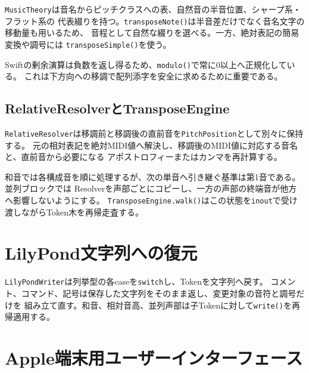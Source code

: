 \documentclass[uplatex,a4paper,11pt]{jsbook}
\begin{document}
\texttt{MusicTheory}は音名からピッチクラスへの表、自然音の半音位置、シャープ系・フラット系の
代表綴りを持つ。\texttt{transposeNote()}は半音差だけでなく音名文字の移動量も用いるため、
音程として自然な綴りを選べる。一方、絶対表記の簡易変換や調号には
\texttt{transposeSimple()}を使う。

Swiftの剰余演算は負数を返し得るため、\texttt{modulo()}で常に0以上へ正規化している。
これは下方向への移調で配列添字を安全に求めるために重要である。



\section{RelativeResolverとTransposeEngine}

\texttt{RelativeResolver}は移調前と移調後の直前音を\texttt{PitchPosition}として別々に保持する。
元の相対表記を絶対MIDI値へ解決し、移調後のMIDI値に対応する音名と、直前音から必要になる
アポストロフィーまたはカンマを再計算する。

和音では各構成音を順に処理するが、次の単音へ引き継ぐ基準は第1音である。並列ブロックでは
Resolverを声部ごとにコピーし、一方の声部の終端音が他方へ影響しないようにする。
\texttt{TransposeEngine.walk()}はこの状態を\texttt{inout}で受け渡しながらToken木を再帰走査する。



\chapter{LilyPond文字列への復元}

\texttt{LilyPondWriter}は列挙型の各caseを\texttt{switch}し、Tokenを文字列へ戻す。
コメント、コマンド、記号は保存した文字列をそのまま返し、変更対象の音符と調号だけを
組み立て直す。和音、相対音高、並列声部は子Tokenに対して\texttt{write()}を再帰適用する。



\chapter{Apple端末用ユーザーインターフェース}
\end{document}
